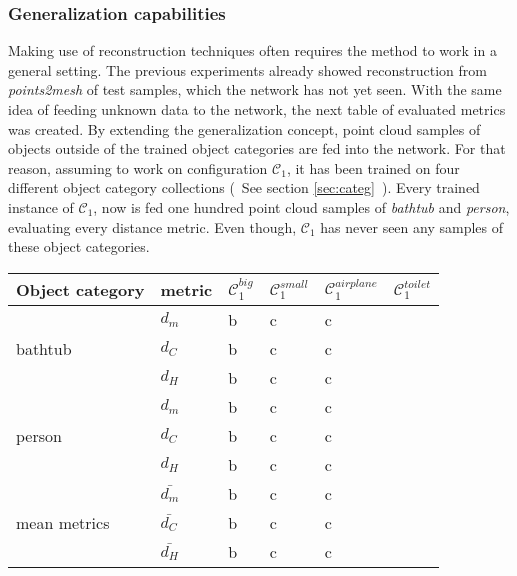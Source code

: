 \subsubsection*{Generalization capabilities}
    Making use of reconstruction techniques often requires the method to work in a general setting.
    The previous experiments already showed reconstruction from \emph{points2mesh} of test samples,
    which the network has not yet seen. With the same idea of feeding unknown data to the network,
    the next table of evaluated metrics was created. By extending the generalization concept, 
    point cloud samples of objects outside of the trained object categories are fed into the network.
    For that reason, assuming to work on configuration $\mathcal{C}_1$, it has been trained on four different
    object category collections (~See section \ref{sec:categ}~).
    Every trained instance of $\mathcal{C}_1$, now is fed one hundred point cloud samples 
    of \emph{bathtub} and \emph{person}, evaluating every distance metric. Even though, $\mathcal{C}_1$ has never seen any samples of these object categories.

\begin{center}
     \label{tab:distance7500} 
    \begin{tabular}{| l | p{1.1cm} | p{1.2cm} | p{1.2cm} | p{1.2cm} | p{1.2cm} |}
        \hline
        Object category& metric& $\mathcal{C}_1^{big}$ & $\mathcal{C}_1^{small}$ & $\mathcal{C}_1^{airplane}$ & $\mathcal{C}_1^{toilet}$\\ \hline
        \multirow{3}{*}{bathtub}&$d_m$&b&c&c&\\
        &$d_C$&b&c&c&\\
        &$d_H$&b&c&c&\\
        \hline
        \multirow{3}{*}{person}&$d_m$&b&c&c&\\
        &$d_C$&b&c&c&\\
        &$d_H$&b&c&c&\\
        \hline\hline
        \multirow{3}{*}{mean metrics}&$\bar{d_m}$&b&c&c&\\
        &$\bar{d_C}$&b&c&c&\\
        &$\bar{d_H}$&b&c&c&\\
        \hline
    \end{tabular}
\end{center}

